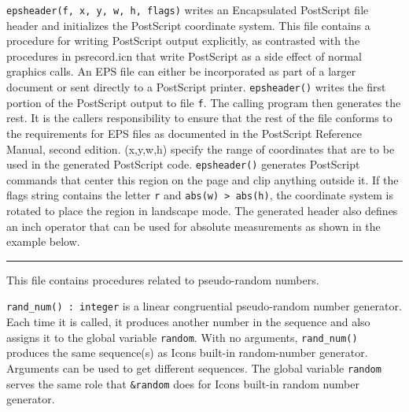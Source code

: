 \texttt{epsheader(f, x, y, w, h, flags)} writes an Encapsulated
PostScript file header and initializes the PostScript coordinate
system. This file contains a procedure for writing PostScript output
explicitly, as contrasted with the procedures in psrecord.icn that
write PostScript as a side effect of normal graphics calls. An EPS file
can either be incorporated as part of a larger document or sent
directly to a PostScript printer. \texttt{epsheader()} writes the first
portion of the PostScript output to file \texttt{f}. The calling
program then generates the rest. It is the caller{\textquotesingle}s
responsibility to ensure that the rest of the file conforms to the
requirements for EPS files as documented in the PostScript Reference
Manual, second edition. (x,y,w,h) specify the range of coordinates that
are to be used in the generated PostScript code. \texttt{epsheader()}
generates PostScript commands that center this region
on the page and clip anything outside it. If the flags string contains
the letter \texttt{{\textquotedbl}r{\textquotedbl}} and \texttt{abs(w)
{\textgreater} abs(h)}, the coordinate system is rotated to place the
region in {\textquotedbl}landscape{\textquotedbl} mode. The generated
header also defines an {\textquotedbl}inch{\textquotedbl} operator that
can be used for absolute measurements as shown in the example below.


\vspace{0.25cm}\hrule{}

This file contains procedures related to pseudo-random numbers.

\texttt{rand\_num() : integer} is a linear congruential pseudo-random
number generator. Each time it is called, it produces
another number in the sequence and also assigns it to the global
variable \texttt{random}. With no arguments, \texttt{rand\_num()}
produces the same sequence(s) as Icon{\textquotesingle}s built-in
random-number generator. Arguments can
be used to get different sequences. The global variable \texttt{random}
serves the same role that \texttt{\&random} does for
Icon{\textquotesingle}s built-in random
number generator.

